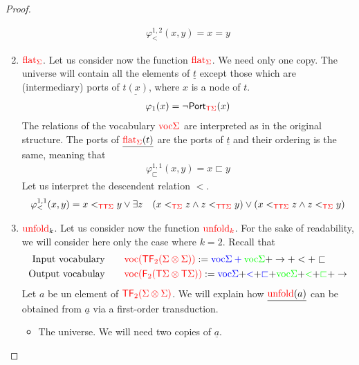 \begin{proof}
\begin{enumerate}
\begin{align*}
\varphi_<^{1,2}(x,y)=x=y
\end{align*}
 \item {${\color{red}{\mathrm{flat}}}_{\color{red}{\Sigma}}$}. Let us consider now the function ${\color{red}{\mathrm{flat}}}_{\color{red}{\Sigma}}$. We need only one copy. The universe will contain all the elements of $\underline{t}$ except those which are (intermediary) ports of $\underline{t(x)}$, where $x$ is a node of $t$.    
 \begin{align*}
 \varphi_1(x)=\neg \mathsf{Port}_{{\color{red}{\mathsf T}} {\color{red}{\Sigma}}}(x)
 \end{align*}
The relations of the vocabulary ${\color{red}{\mathrm{voc}}}{\color{red}{\Sigma}}$ are interpreted as in the original structure. The ports of $\underline{{\color{red}{\mathrm{flat}}}_{\color{red}{\Sigma}}(t)}$ are the ports of $\underline{t}$ and their ordering is the same, meaning that
\begin{align*}
\varphi^{1,1}_{\sqsubset}(x,y)= x\sqsubset y
\end{align*}
Let us interpret the descendent relation $<$. 
\begin{align*}
\varphi^{1,1}_<(x,y)= x<_{\tmonad\tmonad \rSigma}y \vee \exists z\ \ \ (x<_{\tmonad \rSigma}z \wedge z<_{\tmonad\tmonad \rSigma} y) \vee (x<_{\tmonad \tmonad\rSigma}z \wedge z<_{\tmonad \rSigma} y)
\end{align*}
\item ${\color{red}{{\color{red}{\mathrm{unfold}}}}}_k$. Let us consider now the function   ${\color{red}{{\color{red}{\mathrm{unfold}}}_k}}$. For the sake of readability, we will consider here only the case where $k=2$.
Recall that 
\newcommand{\voc}[1]{\mathrm{voc}#1}
\begin{align*}
\text{Input vocabulary} \qquad& \ranked{\voctype(\tmonad  \reduce 2 (\Sigma \otimes \Sigma))} := \color{blue}{\voc \Sigma} + \color{green}{\voc \Sigma}  \color{black}{+ \rightarrow + < + \sqsubset}\\
\text{Output vocabulay} \qquad&
\ranked{\voctype(\reduce 2 (\tmonad\Sigma \otimes \tmonad  \Sigma))} := \color{blue}{\voc \Sigma} \color{black}{+} \color{blue}{<} \color{black}{+}\color{blue}{\sqsubset} \color{black}{+} \color{green}{\voc \Sigma} \color{black}{+} \color{green}{<} \color{black}{+}\color{green}{\sqsubset}  \color{black}{+ \rightarrow}
\end{align*} 
Let $a$ be un element of ${\color{red}{{\color{red}{\mathsf T}}{\color{red}{\mathsf F_{2}}}(\Sigma \otimes \Sigma)}}$. We will explain how
 $\underline{{\color{red}{\mathrm{unfold}}}(a)}$ can be obtained from $\underline{a}$ via a first-order transduction. 
\begin{itemize}
\item The universe.  We will need two copies of $\underline{a}$. 

\end{itemize}
\end{enumerate}
\end{proof}
